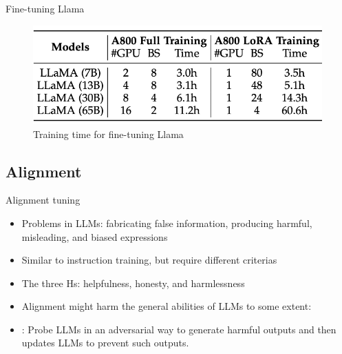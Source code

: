 \documentclass[10pt]{beamer}
\begin{document}

\begin{frame}{Fine-tuning Llama}

\begin{figure}[h]
\centering
\includegraphics[width=0.99\textwidth]{fig/zhao_2023_tab7}
\caption{Training time for fine-tuning Llama}
\end{figure}

\end{frame}


\subsection{Alignment}

\begin{frame}{Alignment tuning}


\begin{itemize}
\item Problems in LLMs: fabricating false information, producing harmful, misleading, and biased expressions
\item Similar to instruction training, but require different criterias
\item The three Hs: helpfulness, honesty, and harmlessness
\item Alignment might harm the general abilities of LLMs to some extent: %
\item {}: Probe LLMs in an adversarial way to generate harmful outputs and then updates LLMs to prevent such outputs.

\end{itemize}

\end{frame}
\end{document}
